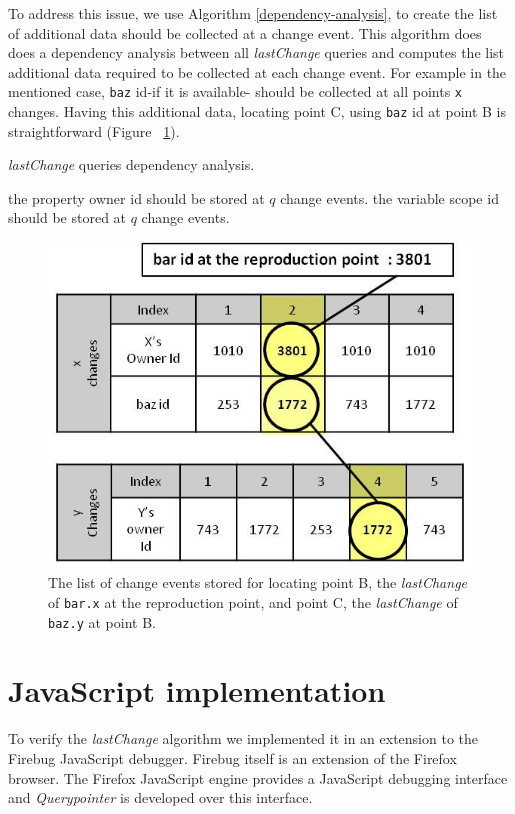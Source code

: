 \documentclass[preprint]{sigplanconf}
\begin{document}
To address this issue, we use Algorithm \ref{dependency-analysis}, to
create the list of additional data should be collected at a change
event. This algorithm does does a dependency analysis between all
\textit{lastChange} queries and computes the list additional data
required to be collected at each change event. For example in the
mentioned case, \texttt{baz} id-if it is available- should be
collected at all points \texttt{x} changes. Having this additional
data, locating point C, using \texttt{baz} id at point B is
straightforward (Figure ~\ref{fig:lastchange-lastchange}).

\begin{algorithm}
\caption{\textit{lastChange} queries dependency analysis.}
\label{dependency-analysis}
\begin{algorithmic}

     \STATE the property owner id should be stored at $q$ change events. 
     \STATE the variable scope id should be stored at $q$ change events.
	 \ENDIF 
 \ENDFOR 
\ENDFOR

\end{algorithmic}
\end{algorithm}

\begin{figure}[htp]
\includegraphics[width=.48\textwidth]{8-lastchange-lastchange.jpg}
\caption{The list of change events stored for locating point B, the
  \textit{lastChange} of \texttt{bar.x} at the reproduction point, and
  point C, the \textit{lastChange} of \texttt{baz.y} at point B.}
\label{fig:lastchange-lastchange}
\end{figure}




\section{JavaScript implementation}
To verify the \textit{lastChange} algorithm we
implemented it in an extension to the Firebug
JavaScript debugger\cite{firebug-version-1.6}. 
Firebug itself is an extension of the Firefox browser\cite{firefox-version-3.6}. The Firefox
JavaScript engine provides a JavaScript debugging interface and
\textit{Querypointer} is developed over this interface. 
\end{document}
